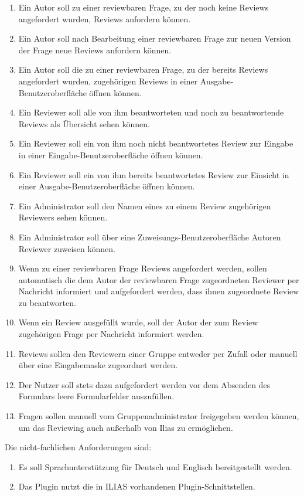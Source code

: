 \documentclass[a4paper]{scrreprt}
\begin{document}
\begin{enumerate}[label= FA \arabic*:]
\item Ein Autor soll zu einer reviewbaren Frage, zu der noch keine Reviews angefordert wurden, Reviews anfordern können.
\item Ein Autor soll nach Bearbeitung einer reviewbaren Frage zur neuen Version der Frage neue Reviews  anfordern können.
\item Ein Autor soll die zu einer reviewbaren Frage, zu der bereits Reviews angefordert wurden, zugehörigen Reviews in einer Ausgabe-Benutzeroberfläche öffnen können.
\item Ein Reviewer soll alle von ihm beantworteten und noch zu beantwortende Reviews als Übersicht sehen können.
\item Ein Reviewer soll ein von ihm noch nicht beantwortetes Review zur Eingabe in einer Eingabe-Benutzeroberfläche öffnen können.
\item Ein Reviewer soll ein von ihm bereits beantwortetes Review zur Einsicht in einer Ausgabe-Benutzeroberfläche öffnen können.
\item Ein Administrator soll den Namen eines zu einem Review zugehörigen Reviewers sehen können.
\item Ein Administrator soll über eine Zuweisungs-Benutzeroberfläche Autoren Reviewer zuweisen können.
\item Wenn zu einer reviewbaren Frage Reviews angefordert werden, sollen automatisch die dem Autor der reviewbaren Frage zugeordneten Reviewer per Nachricht informiert und aufgefordert werden, dass ihnen zugeordnete Review zu beantworten.
\item Wenn ein Review ausgefüllt wurde, soll der Autor der zum Review zugehörigen Frage per Nachricht informiert werden.
\item Reviews sollen den Reviewern einer Gruppe entweder per Zufall oder manuell über eine Eingabemaske zugeordnet werden.
\item Der Nutzer soll stets dazu aufgefordert werden  vor dem Absenden des Formulars  leere Formularfelder auszufüllen.  
\item Fragen sollen manuell vom Gruppenadministrator freigegeben werden können, um das Reviewing auch außerhalb von Ilias zu ermöglichen.
\end{enumerate}


Die nicht-fachlichen Anforderungen sind:
\begin{enumerate}[label=NFA \arabic*:]
\item Es soll Sprachunterstützung für Deutsch und Englisch bereitgestellt werden.
\item Das Plugin nutzt die in ILIAS vorhandenen Plugin-Schnittstellen.
\end{enumerate}
\end{document}
